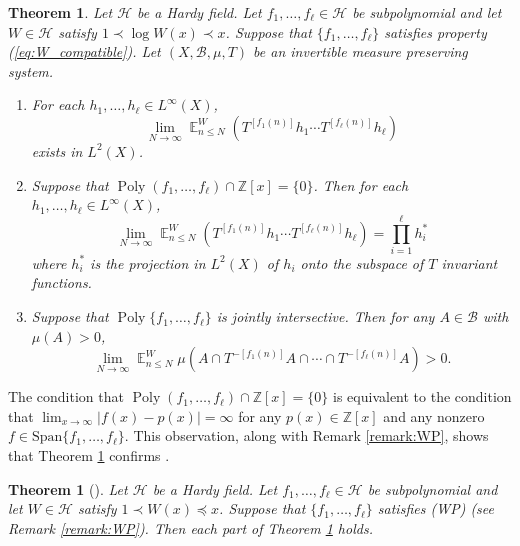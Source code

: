 \documentclass[12pt]{article}
\theoremstyle{plain} %
\newtheorem{theorem}{Theorem}[section]
\theoremstyle{definition} %
\theoremstyle{plain}
\newcounter{MainTheoremCounter}
\newtheorem{maintheorem}[MainTheoremCounter]{Theorem}
\theoremstyle{plain}
\numberwithin{equation}{section}
\newcommand{\Z}{\mathbb{Z}}
\renewcommand{\leq}{\leqslant}
\newcommand{\1}{\mathbbm{1}}
\newcommand{\E}{\operatorname{\mathbb{E}}}
\newcommand{\Poly}{\operatorname{Poly}}
\newcommand{\oo}{\infty}
\newcommand{\round}[1]{[ #1 ]}
\begin{document}
\begin{maintheorem}\label{thm:main}
     Let $\mathcal{H}$ be a Hardy field. Let $f_1,\dots, f_{\ell}\in \mathcal{H}$ be  subpolynomial and let $W\in \mathcal{H}$ satisfy $1\prec \log W(x)\prec x$. Suppose that $\{f_1,\dots, f_{\ell}\}$ satisfies property (\ref{eq:W_compatible}). Let $(X,\mathscr{B},\mu,T)$ be an invertible measure preserving system.
     \begin{enumerate}[label = (\roman*)]
         \item For each $h_1,\dots, h_{\ell}\in L^{\oo}(X)$,
         \begin{equation}\label{eq:Thm_A_1}
             \lim_{N\to\oo}\E_{n\leq N}^W(T^{\round{f_1(n)}}h_1\cdots T^{\round{f_{\ell}(n)}}h_{\ell})
         \end{equation}
         exists in $L^2(X)$.
        \item \label{condition_1}Suppose that $\Poly(f_1,\dots, f_{\ell})\cap \Z[x] = \{0\}$. 
        Then for each $h_1,\dots, h_{\ell}\in L^{\oo}(X)$,
        \begin{equation}\label{eq:Thm_A_2}
             \lim_{N\to\oo}\E_{n\leq N}^W(T^{\round{f_1(n)}}h_1\cdots T^{\round{f_{\ell}(n)}}h_{\ell}) = \prod_{i=1}^{\ell}h_i^*
         \end{equation}
         where $h_i^*$ is the projection in $L^2(X)$ of $h_i$ onto the subspace of $T$ invariant functions.
         \item\label{condition_2} Suppose that $\Poly\{f_1,\dots, f_{\ell}\}$ is jointly intersective.
         Then for any $A\in \mathscr{B}$ with $\mu(A)>0$,
    \begin{equation}\label{eq:Thm_A_3}
             \lim_{N\to\oo}\E_{n\leq N}^W\mu(A\cap T^{-\round{f_1(n)}}A\cap \cdots \cap T^{-\round{f_{\ell}(n)}}A) >0.
         \end{equation}
     \end{enumerate}
\end{maintheorem}
The condition that $\Poly(f_1,\dots, f_{\ell})\cap \Z[x] = \{0\}$ is equivalent to the condition that $\lim_{x\to\oo}|f(x)-p(x)|= \oo$ for any $p(x)\in \Z[x]$ and any nonzero $f\in \text{Span}\{f_1,\dots, f_{\ell}\}$. This observation, along with Remark \ref{remark:WP}, shows that Theorem \ref{thm:main} confirms \cite[Conjecture 6.4]{BMR24}.
\begin{theorem}[{\cite[Conjecture 6.4]{BMR24}}]\label{thm:BMR_conj}
    Let $\mathcal{H}$ be a Hardy field. Let $f_1,\dots, f_{\ell}\in \mathcal{H}$ be  subpolynomial and let $W\in \mathcal{H}$ satisfy $1\prec W(x)\preceq x$. Suppose that $\{f_1,\dots, f_{\ell}\}$ satisfies (WP) (see Remark \ref{remark:WP}). Then each part of Theorem \ref{thm:main} holds.
\end{theorem}
\end{document}
